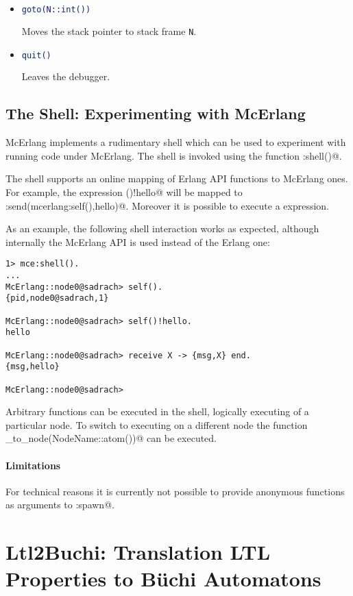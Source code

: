 \documentclass[a4paper]{article}
\begin{document}
\begin{itemize}
\item
\begin{lstlisting}[language=Erlang]
goto(N::int())
\end{lstlisting}
Moves the stack pointer to stack frame \lstinline{N}.

\item
\begin{lstlisting}[language=Erlang]
quit()
\end{lstlisting}
Leaves the debugger.
\end{itemize}

\subsection{The Shell: Experimenting with McErlang}
\label{shell}
McErlang implements a rudimentary shell which can be used
to experiment with running code under McErlang.
The shell is invoked using the function \lstinline@mce:shell()@.

The shell supports an online mapping of Erlang API functions
to McErlang ones. For example, the expression \lstinline@self()!hello@
will be mapped to \lstinline@mcerlang:send(mcerlang:self(),hello)@.
Moreover it is possible to execute a \lstinline@receive@ expression.

As an example, the following shell interaction works as expected,
although internally the McErlang API is used instead of the
Erlang one:
\begin{lstlisting}
1> mce:shell().
...
McErlang::node0@sadrach> self().
{pid,node0@sadrach,1}

McErlang::node0@sadrach> self()!hello.
hello

McErlang::node0@sadrach> receive X -> {msg,X} end.
{msg,hello}

McErlang::node0@sadrach> 
\end{lstlisting}

Arbitrary functions can be executed in the shell, logically
executing of a particular node. To switch to executing on a different
node the function \lstinline@connect_to_node(NodeName::atom())@ can
be executed.

\paragraph{Limitations}
For technical reasons it is currently
not possible to provide anonymous functions as arguments to 
\lstinline@erlang:spawn@.

\section{Ltl2Buchi: Translation LTL Properties to B\"uchi Automatons}
\label{Ltl2buchi}
\end{document}
